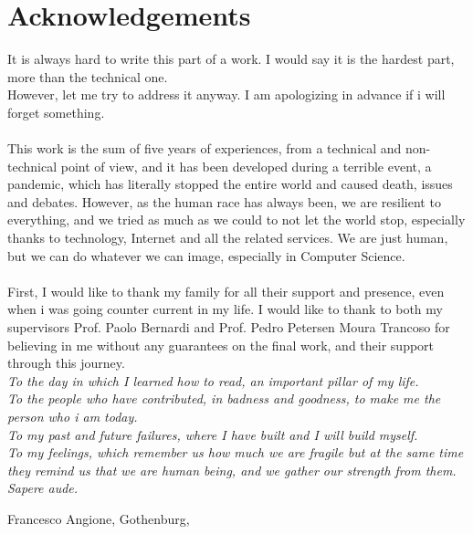 \thispagestyle{plain_cover}			%
\section*{Acknowledgements}
 It is always hard to write this part of a work. I would say it is the hardest part, more than the technical one.\\
However, let me try to address it anyway. I am apologizing in advance if i will forget something.\\\\

This work is the sum of five years of experiences, from a technical and non-technical point of view, and it has been developed during a terrible event, a pandemic, which has literally stopped the entire world and caused death, issues and debates. However, as the human race has always been, we are resilient to everything, and we tried as much as we could to not let the world stop, especially thanks to technology, Internet and all the related services.
We are just human, but we can do whatever we can image, especially in Computer Science.\\\\

First, I would like to thank my family for all their support and presence, even when i was going counter current in my life.
I would like to thank to both my supervisors Prof. Paolo Bernardi and Prof. Pedro Petersen Moura Trancoso for believing in me without any guarantees on the final work, and their support through this journey.\\

\textit{
To the day in which I learned how to read, an important pillar of my life.\\
To the people who have contributed, in badness and goodness, to make me the person who i am today.\\
To my past and future failures, where I have built and I will build myself.\\
To my feelings, which remember us how much we are fragile but at the same time they remind us that we are human being, and we gather our strength from them.\\
Sapere aude.\\}

\vspace{1.5cm}
\hfill
Francesco Angione, Gothenburg, \monthname \space \the\year

\newpage				%
\thispagestyle{empty}
\mbox{}